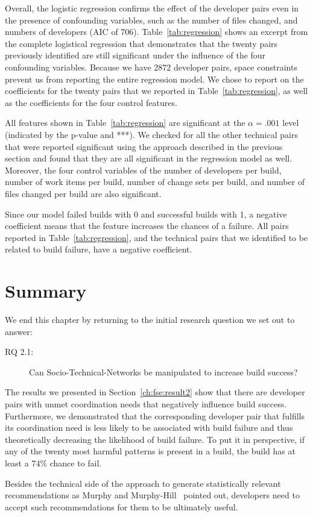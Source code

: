 Overall, the logistic regression confirms the effect of the developer pairs
even in the presence of confounding variables, such as the number of files changed,
and numbers of developers (AIC of 706). 
Table~\ref{tab:regression} shows an excerpt from the complete logistical
regression that demonstrates that the twenty pairs previously identified are still
significant under the influence of the four confounding variables. Because we have 2872 developer pairs, space constraints prevent us from reporting the entire regression model. We chose to report on the coefficients for the twenty pairs that we reported in Table~\ref{tab:regression}, as well as the coefficients for the four control features.

All features shown in Table~\ref{tab:regression} are significant at the $\alpha=.001$ level (indicated by the p-value and ***).
We checked for all the other technical pairs that were reported significant using the approach described in the previous section and found that they are all significant in the regression model as well.
Moreover, the four control variables of the number of developers per build, number
of work items per build, number of change sets per build, and number of files changed per build are also significant.

Since our model failed builds with 0 and successful builds with 1, a negative coefficient means that the feature increases the chances of a failure.
All pairs reported in Table~\ref{tab:regression}, and the technical pairs that we identified to be related to build failure, have a negative coefficient.
 


\section{Summary}
\label{sec:8:conclusions}
We end this chapter by returning to the initial research question we set out to answer:
\begin{description}
  \item[RQ 2.1:] Can Socio-Technical-Networks be manipulated to increase build success? 
\end{description}

The results we presented in Section~\ref{ch:fse:result2} show that there are developer pairs with unmet coordination needs that negatively influence build success.
Furthermore, we demonstrated that the corresponding developer pair that fulfills its coordination need is less likely to be associated with build failure and thus theoretically decreasing the likelihood of build failure.
To put it in perspective, if any of the twenty most harmful patterns is present in a build, the build has at least  a 74\% chance to fail.

Besides the technical side of the approach to generate statistically relevant recommendations as Murphy and Murphy-Hill~\cite{murphy:rsse:2010} pointed out, developers need to accept such recommendations for them to be ultimately useful.